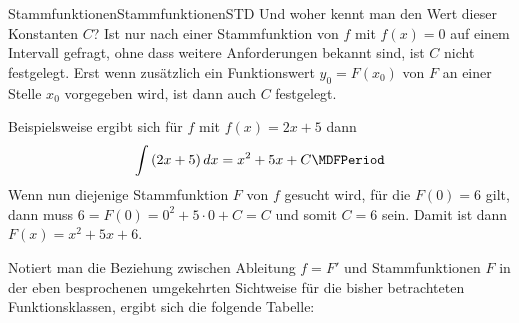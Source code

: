 \begin{MXContent}{Stammfunktionen}{Stammfunktionen}{STD}
Und woher kennt man den Wert dieser Konstanten $C$? 
Ist nur nach einer Stammfunktion von $f$ mit $f(x) = 0$ auf einem Intervall 
gefragt, ohne dass weitere Anforderungen bekannt sind, ist $C$ nicht festgelegt.
Erst wenn zusätzlich ein Funktionswert $y_0 = F(x_0)$ von $F$ an einer 
Stelle $x_0$ vorgegeben wird, ist dann auch $C$ festgelegt.
\begin{MExample}
Beispielsweise ergibt sich für $f$ mit $f(x) = 2x + 5$ dann
\[
\int \left( 2 x + 5 \right) \MD x = x^2 + 5x + C \MDFPeriod %
\]
Wenn nun diejenige Stammfunktion $F$ von $f$ gesucht wird, für die $F(0) = 6$
gilt, dann muss $6 = F(0) = 0^2 + 5 \cdot 0 + C = C$ und somit $C = 6$ sein.
Damit ist dann $F(x) = x^2 + 5 x + 6$.
\end{MExample}
Notiert man die Beziehung zwischen Ableitung $f = F'$ und Stammfunktionen $F$ in 
der eben besprochenen umgekehrten Sichtweise für die bisher betrachteten 
Funktionsklassen, ergibt sich die folgende Tabelle:


\end{MXContent}
